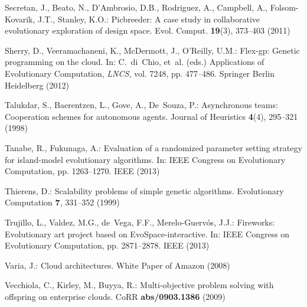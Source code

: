 \begin{thebibliography}{10}
Secretan, J., Beato, N., D'Ambrosio, D.B., Rodriguez, A., Campbell, A.,
  Folsom-Kovarik, J.T., Stanley, K.O.: Picbreeder: A case study in
  collaborative evolutionary exploration of design space.
\newblock Evol. Comput. \textbf{19}(3), 373--403 (2011)

Sherry, D., Veeramachaneni, K., McDermott, J., O'Reilly, U.M.: Flex-gp: Genetic
  programming on the cloud.
\newblock In: C.~di~Chio, et~al. (eds.) Applications of Evolutionary
  Computation, \emph{LNCS}, vol. 7248, pp. 477--486. Springer Berlin Heidelberg
  (2012)

Talukdar, S., Baerentzen, L., Gove, A., De~Souza, P.: Asynchronous teams:
  Cooperation schemes for autonomous agents.
\newblock Journal of Heuristics \textbf{4}(4), 295--321 (1998)

Tanabe, R., Fukunaga, A.: Evaluation of a randomized parameter setting strategy
  for island-model evolutionary algorithms.
\newblock In: IEEE Congress on Evolutionary Computation, pp. 1263--1270. IEEE
  (2013)

Thierens, D.: Scalability problems of simple genetic algorithms.
\newblock Evolutionary Computation \textbf{7}, 331--352 (1999)

Trujillo, L., Valdez, M.G., de~Vega, F.F., Merelo-Guerv\'os, J.J.: {Fireworks:
  Evolutionary art project based on EvoSpace-interactive}.
\newblock In: IEEE Congress on Evolutionary Computation, pp. 2871--2878. IEEE
  (2013)

Varia, J.: Cloud architectures.
\newblock White Paper of Amazon  (2008)

Vecchiola, C., Kirley, M., Buyya, R.: Multi-objective problem solving with
  offspring on enterprise clouds.
\newblock CoRR \textbf{abs/0903.1386} (2009)

\end{thebibliography}






